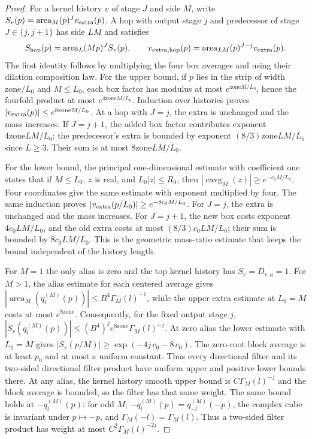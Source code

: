 \begin{proof}
For a kernel history $v$ of stage $J$ and side $M$, write
$S_v(p)=\operatorname{area}_M(p)^Jv_{\rm extra}(p)$. A hop with output
stage $j$ and predecessor of stage $J\in\{j,j+1\}$ has side $LM$ and
satisfies
\[
 S_{\rm hop}(p)=\operatorname{area}_L(Mp)^J S_v(p),\qquad
 v_{{\rm extra},{\rm hop}}(p)=
     \operatorname{area}_{LM}(p)^{J-j}v_{\rm extra}(p).
\]
The first identity follows by multiplying the four box averages and using
their dilation composition law. For the upper bound, if $p$ lies in the
strip of width $\mathrm{zone}/L_0$ and $M\leq L_0$, each box factor has
modulus at most $e^{\mathrm{zone}M/L_0}$, hence the fourfold product at most
$e^{4\mathrm{zone}M/L_0}$. Induction over histories proves
$|v_{\rm extra}(p)|\leq e^{8\mathrm{zone}M/L_0}$. At a hop with $J=j$,
the extra is unchanged and the mass increases. If $J=j+1$, the added box
factor contributes exponent $4\mathrm{zone}LM/L_0$; the predecessor's
extra is bounded by exponent $(8/3)\mathrm{zone}LM/L_0$ since $L\geq3$.
Their sum is at most $8\mathrm{zone}LM/L_0$.

For the lower bound, the principal one-dimensional estimate with coefficient
one states that if $M\leq L_0$, $z$ is real, and $L_0|z|\leq
R_0$, then
$|\operatorname{cavg}_M(z)|\geq
e^{-c_0M/L_0}$. Four coordinates give the same estimate
with exponent multiplied by four. The same induction proves
$|v_{\rm extra}(p/L_0)|\geq e^{-8c_0M/L_0}$.
For $J=j$, the extra is unchanged and the mass increases. For $J=j+1$,
the new box costs exponent $4c_0LM/L_0$, and the old
extra costs at most $(8/3)c_0LM/L_0$; their sum is bounded
by $8c_0LM/L_0$. This is the geometric mass-ratio estimate
that keeps the bound independent of the history length.

For $M=1$ the only alias is zero and the top kernel history has $S_v=D_{v,a}=1$. For $M>1$, the alias estimate for each centered average gives
$|\operatorname{area}_M(q_l^{(M)}(p))|\leq B^4\Gamma_M(l)^{-1}$, while the
upper extra estimate at $L_0=M$ costs at most $e^{8\mathrm{zone}}$.
Consequently, for the fixed output stage $j$,
$|S_v(q_l^{(M)}(p))|\leq (B^4)^j e^{8\mathrm{zone}}\Gamma_M(l)^{-j}$.
At zero alias the lower estimate with $L_0=M$ gives
$|S_v(p/M)|\geq\exp(-4j\,c_0-8\,c_0)$.
The zero-root block average is at least $p_0$ and at most a uniform
constant. Thus every directional filter and its two-sided directional filter product have uniform
upper and positive lower bounds there. At any alias, the kernel history smooth upper
bound is $C\Gamma_M(l)^{-j}$ and the block average is bounded, so the filter has that
same weight. The same bound holds at $-q_l^{(M)}(p)$: for odd $M$,
$-q_l^{(M)}(p)=q_{-l}^{(M)}(-p)$, the complex cube is invariant under
$p\mapsto-p$, and $\Gamma_M(-l)=\Gamma_M(l)$. Thus a two-sided filter
product has weight at most $C^2\Gamma_M(l)^{-2j}$.


\end{proof}
